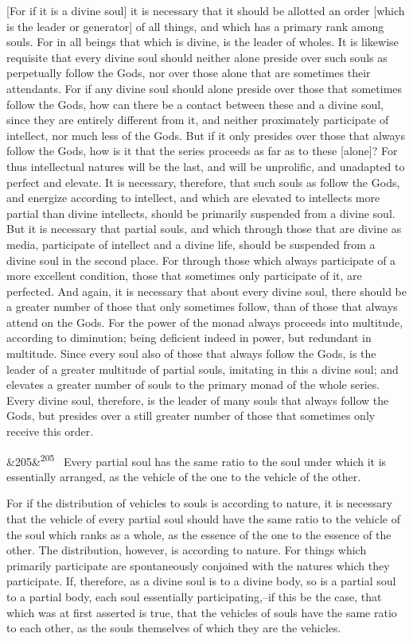 \documentclass[12pt]{article}
\newcommand{\para}[1][]{\par\noindent\ifx&#1&\else\textsuperscript{\footnotesize #1}~\fi}
\begin{document}
[For if it is a divine soul] it is necessary that it should be allotted an order [which is the leader or generator] of all things, and which has a primary rank among souls. For in all beings that which is divine, is the leader of wholes. It is likewise requisite that every divine soul should neither alone preside over such souls as perpetually follow the Gods, nor over those alone that are sometimes their attendants. For if any divine soul should alone preside over those that sometimes follow the Gods, how can there be a contact between these and a divine soul, since they are entirely different from it, and neither proximately participate of intellect, nor much less of the Gods. But if it only presides over those that always follow the Gods, how is it that the series proceeds as far as to these [alone]? For thus intellectual natures will be the last, and will be unprolific, and unadapted to perfect and elevate. It is necessary, therefore, that such souls as follow the Gods, and energize according to intellect, and which are elevated to intellects more partial than divine intellects, should be primarily suspended from a divine soul. But it is necessary that partial souls, and which through those that are divine as media, participate of intellect and a divine life, should be suspended from a divine soul in the second place. For through those which always participate of a more excellent condition, those that sometimes only participate of it, are perfected. And again, it is necessary that about every divine soul, there should be a greater number of those that only sometimes follow, than of those that always attend on the Gods. For the power of the monad always proceeds into multitude, according to diminution; being deficient indeed in power, but redundant in multitude. Since every soul also of those that always follow the Gods, is the leader of a greater multitude of partial souls, imitating in this a divine soul; and elevates a greater number of souls to the primary monad of the whole series. Every divine soul, therefore, is the leader of many souls that always follow the Gods, but presides over a still greater number of those that sometimes only receive this order.

\para[205] Every partial soul has the same ratio to the soul under which it is essentially arranged, as the vehicle of the one to the vehicle of the other.

For if the distribution of vehicles to souls is according to nature, it is necessary that the vehicle of every partial soul should have the same ratio to the vehicle of the soul which ranks as a whole, as the essence of the one to the essence of the other. The distribution, however, is according to nature. For things which primarily participate are spontaneously conjoined with the natures which they participate. If, therefore, as a divine soul is to a divine body, so is a partial soul to a partial body, each soul essentially participating,--if this be the case, that which was at first asserted is true, that the vehicles of souls have the same ratio to each other, as the souls themselves of which they are the vehicles.
\end{document}
